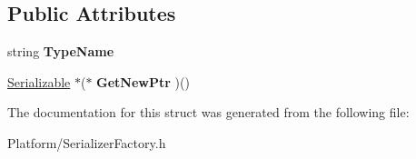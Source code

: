 \subsection*{Public Attributes}
\begin{DoxyCompactItemize}
\item 
\mbox{\label{struct_gost_crypt_1_1_serializer_factory_1_1_map_entry_a8fdcbec1eb8c8962a992820bb21afc8f}} 
string {\bfseries Type\+Name}
\item 
\mbox{\label{struct_gost_crypt_1_1_serializer_factory_1_1_map_entry_a5ae508a9f36c734cd5b00295f78c65b0}} 
\hyperlink{class_gost_crypt_1_1_serializable}{Serializable} $\ast$($\ast$ {\bfseries Get\+New\+Ptr} )()
\end{DoxyCompactItemize}


The documentation for this struct was generated from the following file\+:\begin{DoxyCompactItemize}
\item 
Platform/Serializer\+Factory.\+h\end{DoxyCompactItemize}

